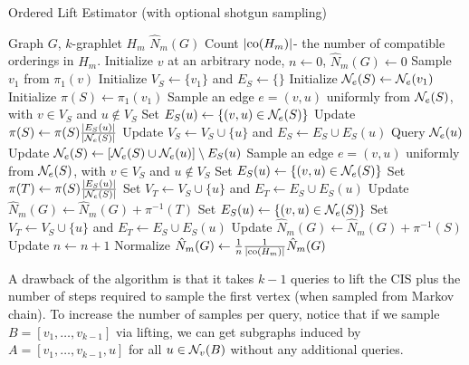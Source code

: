 \begin{algorithm}[h]
\label{alg:OLE}
\caption{Ordered Lift Estimator (with optional shotgun sampling)}
\begin{algorithmic}
    \INPUT Graph $G$, $k$-graphlet $H_m$
    \OUTPUT $\hat N_m(G)$
    \STATE Count $|\mathrm{co}(H_m)|$- the number of compatible orderings in $H_m$.
    \STATE Initialize $v$ at an arbitrary node, $n \gets 0$, $\hat N_m(G) \gets 0$
        \STATE Sample $v_1$ from $\pi_1(v)$
        \STATE Initialize $V_S \gets \{v_1\}$ and $E_S \gets \{\}$
        \STATE Initialize $\mathcal{N}_e(S)\gets \mathcal{N}_e(v_1)$
        \STATE Initialize $\pi(S) \gets \pi_1(v_1)$
            \STATE Sample an edge $e=(v,u)$ uniformly from $\mathcal{N}_e(S)$, with $v\in V_S$ and $u\notin V_S$
            \STATE Set $E_S(u) \gets \{(v,u)\in \mathcal{N}_e(S)\}$
            \STATE Update $\pi(S)\gets \pi(S)\frac{|E_S(u)|}{|\mathcal{N}_e(S)|}$
            \STATE Update $V_S\gets V_S\cup\{u\}$ and $E_S \gets E_S \cup E_S(u)$
            \STATE Query $\mathcal{N}_e(u)$
            \STATE Update $\mathcal{N}_e(S) \gets [\mathcal{N}_e(S)\cup\mathcal{N}_e(u)]\setminus E_S(u)$
        \ENDWHILE
            \STATE Sample an edge $e=(v,u)$ uniformly from $\mathcal{N}_e(S)$, with $v\in V_S$ and $u\notin V_S$
            \STATE Set $E_S(u) \gets \{(v,u)\in \mathcal{N}_e(S)\}$
            \STATE Set $\pi(T)\gets \pi(S)\frac{|E_S(u)|}{|\mathcal{N}_e(S)|}$
            \STATE Set $V_T\gets V_S\cup\{u\}$ and $E_T \gets E_S\cup E_S(u)$
                \STATE Update $\hat N_m(G) \gets \hat N_m(G) + \pi^{-1}(T)$ 
            \ENDIF
        \ENDIF
                \STATE Set $E_S(u) \gets \{(v,u)\in \mathcal{N}_e(S)\}$
                \STATE Set $V_T\gets V_S\cup\{u\}$ and $E_T \gets E_S \cup E_S(u)$
                    \STATE Update $\hat N_m(G) \gets \hat N_m(G) + \pi^{-1}(S)$
                \ENDIF
            \ENDFOR
        \ENDIF
        \STATE Update $n \gets n + 1$
    \ENDWHILE
    \STATE Normalize $\hat N_m(G) \gets \frac{1}{n}\frac{1}{|\mathrm{co}(H_m)|}\hat N_m(G)$
\end{algorithmic}
\end{algorithm}
	
	A drawback of the algorithm is that it takes $k-1$ queries to lift the CIS plus the number of steps required to sample the first vertex (when sampled from Markov chain). 
	To increase the number of samples per query, notice that if we sample $B = [v_1, \ldots, v_{k-1}]$ via lifting, we can get subgraphs induced by $A = [v_1,\ldots, v_{k-1},u]$ for all $u \in \mathcal{N}_v(B)$ without any additional queries.
	

